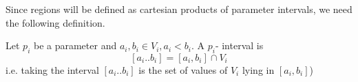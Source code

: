 Since regions will be defined as cartesian products of parameter intervals, we need the following definition.
\begin{definition} Let $p_{i}$ be a parameter and $a_{i},b_{i}\in V_{i},a_{i}<b_{i}$.
A $p_{i}$- interval is
	\[
	\left[a_{i}..b_{i}\right]=\left[a_{i},b_{i}\right]\cap V_{i}
	\]
i.e. taking the interval $\left[a_{i}..b_{i}\right]$
is the set of values of $V_{i}$ lying in $\left[a_{i},b_{i}\right]$)
\end{definition}


	\begin{figure}[t]
		\begin{center}
		\end{center}
	\end{figure}



